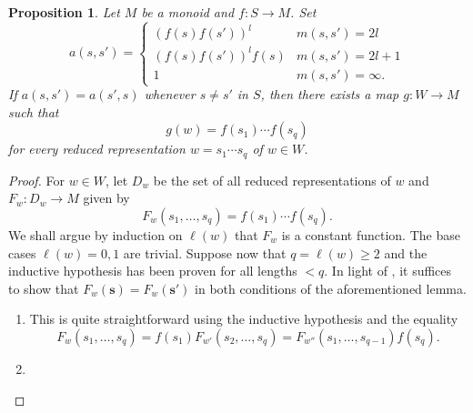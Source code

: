 \documentclass{article}
\theoremstyle{thmstyle}
\newtheorem{proposition}[theorem]{Proposition}
\theoremstyle{defstyle}
\renewcommand{\ge}{\geqslant}
\begin{document}
\begin{proposition}
    Let $M$ be a monoid and $f: S\to M$. Set 
    \begin{equation*}
        a(s, s') = 
        \begin{cases}
            \left(f(s)f(s')\right)^l & m(s, s') = 2l\\
            \left(f(s)f(s')\right)^l f(s) & m(s, s') = 2l + 1\\
            1 & m(s, s') = \infty.
        \end{cases}
    \end{equation*}
    If $a(s, s') = a(s' ,s)$ whenever $s\ne s'$ in $S$, then there exists a map $g: W\to M$ such that 
    \begin{equation*}
        g(w) = f(s_1)\cdots f(s_q)
    \end{equation*}
    for every reduced representation $w = s_1\cdots s_q$ of $w\in W$.
\end{proposition}
\begin{proof}
    For $w\in W$, let $D_w$ be the set of all reduced representations of $w$ and $F_w: D_w\to M$ given by 
    \begin{equation*}
        F_w(s_1,\dots,s_q) = f(s_1)\cdots f(s_q).
    \end{equation*}
    We shall argue by induction on $\ell(w)$ that $F_w$ is a constant function. The base cases $\ell(w) = 0, 1$ are trivial. Suppose now that $q = \ell(w)\ge 2$ and the inductive hypothesis has been proven for all lengths $< q$. In light of , it suffices to show that $F_w(\mathbf s) = F_w(\mathbf s')$ in both conditions of the aforementioned lemma. 
    \begin{enumerate}[label=(\roman*)]
        \item This is quite straightforward using the inductive hypothesis and the equality
        \begin{equation*}
            F_w(s_1,\dots,s_q) = f(s_1)F_{w'}(s_2,\dots,s_q) = F_{w''}(s_1,\dots,s_{q - 1})f(s_q).
        \end{equation*}
        \item {}\qedhere
    \end{enumerate}
\end{proof}
\end{document}
